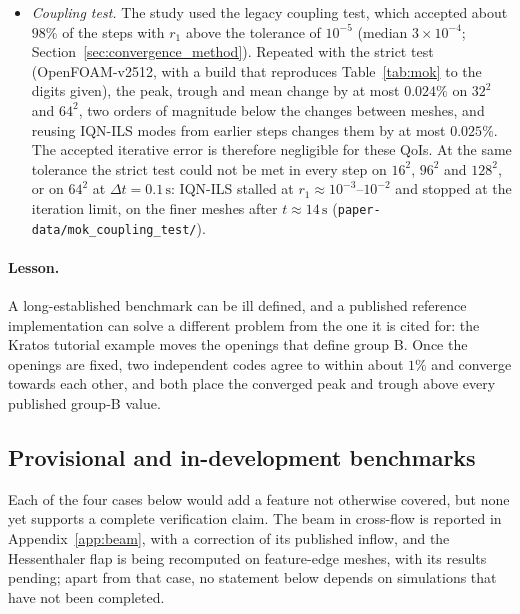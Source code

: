 \begin{itemize}
	\item \emph{Coupling test.} The study used the legacy coupling test, which accepted about $98\%$ of the steps with $r_1$ above the tolerance of $10^{-5}$ (median $3\times10^{-4}$; Section~\ref{sec:convergence_method}). Repeated with the strict test (OpenFOAM-v2512, with a build that reproduces Table~\ref{tab:mok} to the digits given), the peak, trough and mean change by at most $0.024\%$ on $32^2$ and $64^2$, two orders of magnitude below the changes between meshes, and reusing IQN-ILS modes from earlier steps changes them by at most $0.025\%$. The accepted iterative error is therefore negligible for these QoIs. At the same tolerance the strict test could not be met in every step on $16^2$, $96^2$ and $128^2$, or on $64^2$ at $\Delta t = 0.1\,\mathrm{s}$: IQN-ILS stalled at $r_1 \approx 10^{-3}$--$10^{-2}$ and stopped at the iteration limit, on the finer meshes after $t \approx 14\,\mathrm{s}$ (\texttt{paper-data/mok\_coupling\_test/}).
\end{itemize}

\paragraph{Lesson.}
A long-established benchmark can be ill defined, and a published reference implementation can solve a different problem from the one it is cited for: the Kratos tutorial example moves the openings that define group B.
Once the openings are fixed, two independent codes agree to within about $1\%$ and converge towards each other, and both place the converged peak and trough above every published group-B value.


\subsection{Provisional and in-development benchmarks}\label{sec:provisional}

Each of the four cases below would add a feature not otherwise covered, but none yet supports a complete verification claim. The beam in cross-flow is reported in Appendix~\ref{app:beam}, with a correction of its published inflow, and the Hessenthaler flap is being recomputed on feature-edge meshes, with its results pending; apart from that case, no statement below depends on simulations that have not been completed.

